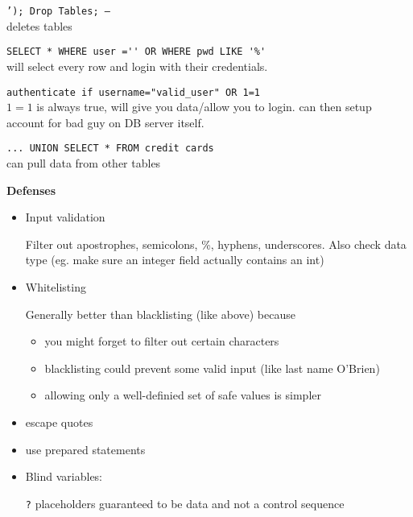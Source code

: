 
\begin{example}
	\texttt{'); Drop Tables; --}\\
	\hspace*{2cm}deletes tables
\end{example}

\begin{example}
	\verb|SELECT * WHERE user ='' OR WHERE pwd LIKE '%'|\\
	\hspace*{2cm}will select every row and login with their credentials.
\end{example}

\begin{example}
	\verb|authenticate if username="valid_user" OR 1=1 |\\
	\hspace*{2cm} $1=1$ is always true, will give you data/allow you to login. can then setup account for bad guy on DB server itself.
\end{example}


\begin{example}
	\verb|... UNION SELECT * FROM credit cards|\\
	\hspace*{2cm} can pull data from other tables
\end{example}

\textbf{Defenses}\\
\begin{itemize}
	\item Input validation

		Filter out apostrophes, semicolons, \%, hyphens, underscores. Also check data type (eg. make sure an integer field actually contains an int)
	\item Whitelisting

		Generally better than blacklisting (like above) because
		\begin{itemize}
			\item you might forget to filter out certain characters
			\item blacklisting could prevent some valid input (like last name O'Brien)
			\item allowing only a well-definied set of safe values is simpler
		\end{itemize}
	\item escape quotes
	\item use prepared statements
	\item Blind variables:

		\texttt{?} placeholders guaranteed to be data and not a control sequence %
\end{itemize}

